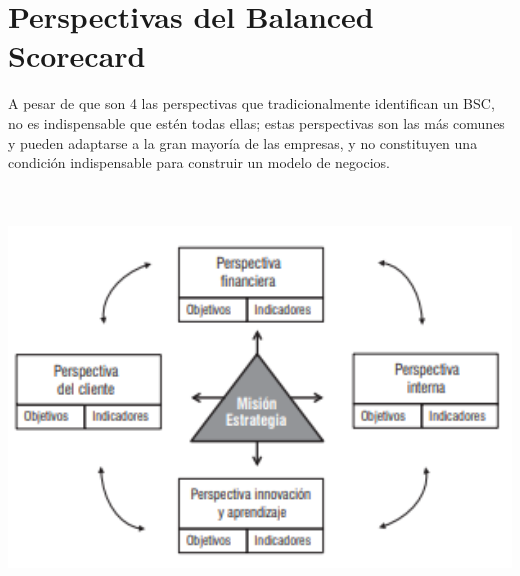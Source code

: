 \section{Perspectivas del Balanced Scorecard}
\item{A pesar de que son 4 las perspectivas que tradicionalmente identifican un BSC, no es indispensable que estén todas ellas; estas perspectivas son las más comunes y pueden adaptarse a la gran mayoría de las empresas, y no constituyen una condición indispensable para construir un modelo de negocios.\\\\\

\begin{center}
\includegraphics[width=15cm]{./Imagenes/Imagen02}
\end{center}

}
